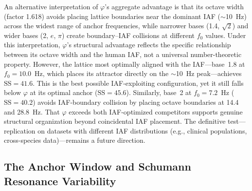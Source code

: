 \documentclass[11pt,a4paper]{article}
\newcommand{\phisym}{\varphi}
\newcommand{\fzero}{f_0}
\begin{document}
An alternative interpretation of $\phisym$'s aggregate advantage is that its octave width (factor 1.618) avoids placing lattice boundaries near the dominant IAF ($\sim$10~Hz) across the widest range of anchor frequencies, while narrower bases (1.4, $\sqrt{2}$) and wider bases (2, $e$, $\pi$) create boundary--IAF collisions at different $\fzero$ values. Under this interpretation, $\phisym$'s structural advantage reflects the specific relationship between its octave width and the human IAF, not a universal number-theoretic property. However, the lattice most optimally aligned with the IAF---base~1.8 at $\fzero = 10.0$~Hz, which places its attractor directly on the $\sim$10~Hz peak---achieves $\text{SS} = 41.6$. This is the best possible IAF-exploiting configuration, yet it still falls below $\phisym$ at its optimal anchor ($\text{SS} = 45.6$). Similarly, base~2 at $\fzero = 7.2$~Hz ($\text{SS} = 40.2$) avoids IAF-boundary collision by placing octave boundaries at 14.4 and 28.8~Hz. That $\phisym$ exceeds both IAF-optimized competitors supports genuine structural organization beyond coincidental IAF placement. The definitive test---replication on datasets with different IAF distributions (e.g., clinical populations, cross-species data)---remains a future direction.

\subsection{The Anchor Window and Schumann Resonance Variability}
\end{document}
